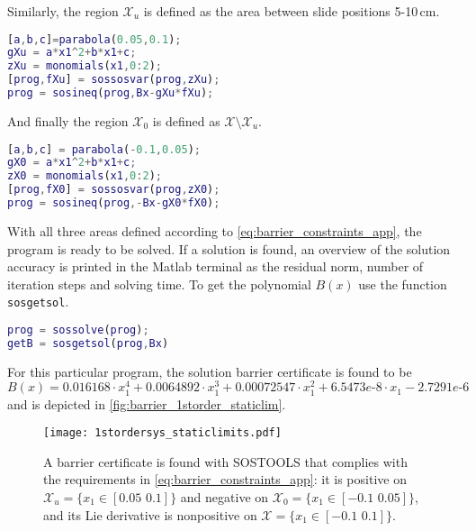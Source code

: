 Similarly, the region $\mathcal{X}_u$ is defined as the area between slide positions 5-10\,cm.
\begin{lstlisting}[language=matlab]
% Define space Xu in X
[a,b,c]=parabola(0.05,0.1);
gXu = a*x1^2+b*x1+c;
zXu = monomials(x1,0:2);
[prog,fXu] = sossosvar(prog,zXu);
prog = sosineq(prog,Bx-gXu*fXu);
\end{lstlisting}
And finally the region $\mathcal{X}_0$ is defined as $\mathcal{X}\setminus\mathcal{X}_u$.
\begin{lstlisting}[language=matlab]
% Define space X0 in X
[a,b,c] = parabola(-0.1,0.05);
gX0 = a*x1^2+b*x1+c;
zX0 = monomials(x1,0:2);
[prog,fX0] = sossosvar(prog,zX0);
prog = sosineq(prog,-Bx-gX0*fX0);
\end{lstlisting}
With all three areas defined according to \autoref{eq:barrier_constraints_app}, the program is ready to be solved. If a solution is found, an overview of the solution accuracy is printed in the Matlab terminal as the residual norm, number of iteration steps and solving time. To get the polynomial $B(x)$ use the function \verb|sosgetsol|.
\begin{lstlisting}[language=matlab]
% Solve for B
prog = sossolve(prog);
getB = sosgetsol(prog,Bx)
\end{lstlisting}
For this particular program, the solution barrier certificate is found to be
\begin{equation}
B(x) = 0.016168\cdot x_1^4 + 0.0064892\cdot x_1^3 + 0.00072547\cdot x_1^2 + 6.5473e\text{-}8\cdot x_1 - 2.7291e\text{-}6
\end{equation}
and is depicted in \autoref{fig:barrier_1storder_staticlim}.

\begin{figure}[htbp]
\hspace*{-12mm}
\texttt{[image: 1stordersys\_staticlimits.pdf]}
\caption{A barrier certificate is found with SOSTOOLS that complies with the requirements in \autoref{eq:barrier_constraints_app}: it is positive on $\mathcal{X}_u=\{x_1\in [0.05\,\,0.1]\}$ and negative on $\mathcal{X}_0=\{x_1\in [-0.1\,\,0.05]\}$, and its Lie derivative is nonpositive on $\mathcal{X}=\{x_1\in [-0.1\,\,0.1]\}$.}
\label{fig:barrier_1storder_staticlim}
\end{figure}

